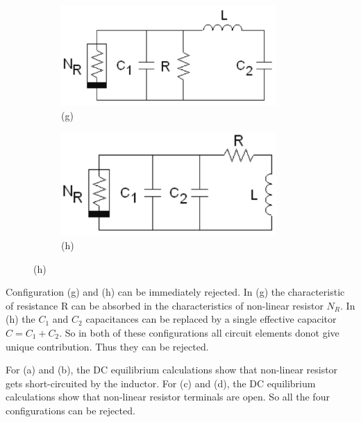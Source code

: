 \documentclass[12pt]{article}
\begin{document}
\begin{figure}[H]
	\centering
	\caption{Fig 1. Possible configurations for circuit}
	\begin{subfigure}[b]{0.5\textwidth}
		\centering
		\includegraphics[width=0.9\textwidth]{Images/fig1(g).png}
		\caption{(g)}
		\label{fig:1g}
	\end{subfigure}%
	\begin{subfigure}[b]{0.5\textwidth}
		\centering
		\includegraphics[width=0.9\textwidth]{Images/fig1(h).png}
		\caption{(h)}
		\label{fig:1h}
	\end{subfigure}
\end{figure}
Configuration (g) and (h) can be immediately rejected. \linebreak
In (g) the characteristic of resistance R can be absorbed in the characteristics of non-linear resistor $N_R$.
In (h) the $C_1$ and $C_2$ capacitances can be replaced by a single effective capacitor $C=C_1+C_2$. 
So in both of these configurations all circuit elements donot give unique contribution. Thus they can be rejected.\linebreak

For (a) and (b), the DC equilibrium calculations show that non-linear resistor gets short-circuited by the inductor. 
For (c) and (d), the DC equilibrium calculations show that non-linear resistor terminals are open.
So all the four configurations can be rejected. \linebreak
\end{document}
